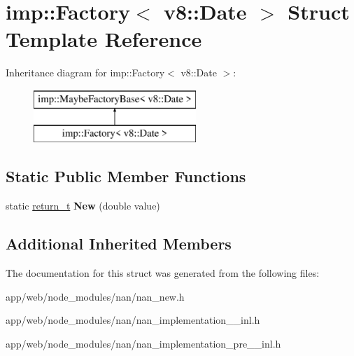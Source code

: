 \hypertarget{structimp_1_1_factory_3_01v8_1_1_date_01_4}{}\section{imp\+:\+:Factory$<$ v8\+:\+:Date $>$ Struct Template Reference}
\label{structimp_1_1_factory_3_01v8_1_1_date_01_4}
Inheritance diagram for imp\+:\+:Factory$<$ v8\+:\+:Date $>$\+:\begin{figure}[H]
\begin{center}
\leavevmode
\includegraphics[height=2.000000cm]{structimp_1_1_factory_3_01v8_1_1_date_01_4}
\end{center}
\end{figure}
\subsection*{Static Public Member Functions}
\begin{DoxyCompactItemize}
\item 
\mbox{\label{structimp_1_1_factory_3_01v8_1_1_date_01_4_a85d8a175bd10010fb2413569d292ba91}} 
static \hyperlink{class_maybe_local}{return\+\_\+t} {\bfseries New} (double value)
\end{DoxyCompactItemize}
\subsection*{Additional Inherited Members}


The documentation for this struct was generated from the following files\+:\begin{DoxyCompactItemize}
\item 
app/web/node\+\_\+modules/nan/nan\+\_\+new.\+h\item 
app/web/node\+\_\+modules/nan/nan\+\_\+implementation\+\_\+\_\+inl.\+h\item 
app/web/node\+\_\+modules/nan/nan\+\_\+implementation\+\_\+pre\+\_\+\_\+inl.\+h\end{DoxyCompactItemize}
